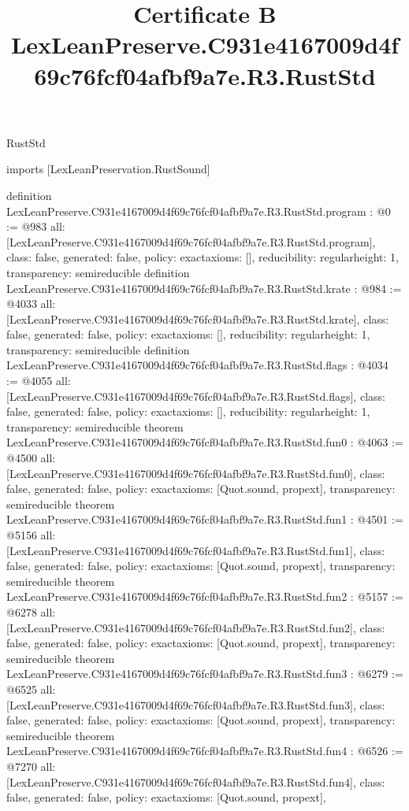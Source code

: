 \begin{lexlean}{RustStd}
\title{Certificate B LexLeanPreserve.C931e4167009d4f69c76fcf04afbf9a7e.R3.RustStd}
\begin{coremodule}
imports [LexLeanPreservation.RustSound]

definition LexLeanPreserve.C931e4167009d4f69c76fcf04afbf9a7e.R3.RustStd.program : @0 := @983 {
  all: [LexLeanPreserve.C931e4167009d4f69c76fcf04afbf9a7e.R3.RustStd.program],
  class: false,
  generated: false,
  policy: exact{axioms: []},
  reducibility: regular{height: 1},
  transparency: semireducible
}
definition LexLeanPreserve.C931e4167009d4f69c76fcf04afbf9a7e.R3.RustStd.krate : @984 := @4033 {
  all: [LexLeanPreserve.C931e4167009d4f69c76fcf04afbf9a7e.R3.RustStd.krate],
  class: false,
  generated: false,
  policy: exact{axioms: []},
  reducibility: regular{height: 1},
  transparency: semireducible
}
definition LexLeanPreserve.C931e4167009d4f69c76fcf04afbf9a7e.R3.RustStd.flags : @4034 := @4055 {
  all: [LexLeanPreserve.C931e4167009d4f69c76fcf04afbf9a7e.R3.RustStd.flags],
  class: false,
  generated: false,
  policy: exact{axioms: []},
  reducibility: regular{height: 1},
  transparency: semireducible
}
theorem LexLeanPreserve.C931e4167009d4f69c76fcf04afbf9a7e.R3.RustStd.fun0 : @4063 := @4500 {
  all: [LexLeanPreserve.C931e4167009d4f69c76fcf04afbf9a7e.R3.RustStd.fun0],
  class: false,
  generated: false,
  policy: exact{axioms: [Quot.sound, propext]},
  transparency: semireducible
}
theorem LexLeanPreserve.C931e4167009d4f69c76fcf04afbf9a7e.R3.RustStd.fun1 : @4501 := @5156 {
  all: [LexLeanPreserve.C931e4167009d4f69c76fcf04afbf9a7e.R3.RustStd.fun1],
  class: false,
  generated: false,
  policy: exact{axioms: [Quot.sound, propext]},
  transparency: semireducible
}
theorem LexLeanPreserve.C931e4167009d4f69c76fcf04afbf9a7e.R3.RustStd.fun2 : @5157 := @6278 {
  all: [LexLeanPreserve.C931e4167009d4f69c76fcf04afbf9a7e.R3.RustStd.fun2],
  class: false,
  generated: false,
  policy: exact{axioms: [Quot.sound, propext]},
  transparency: semireducible
}
theorem LexLeanPreserve.C931e4167009d4f69c76fcf04afbf9a7e.R3.RustStd.fun3 : @6279 := @6525 {
  all: [LexLeanPreserve.C931e4167009d4f69c76fcf04afbf9a7e.R3.RustStd.fun3],
  class: false,
  generated: false,
  policy: exact{axioms: [Quot.sound, propext]},
  transparency: semireducible
}
theorem LexLeanPreserve.C931e4167009d4f69c76fcf04afbf9a7e.R3.RustStd.fun4 : @6526 := @7270 {
  all: [LexLeanPreserve.C931e4167009d4f69c76fcf04afbf9a7e.R3.RustStd.fun4],
  class: false,
  generated: false,
  policy: exact{axioms: [Quot.sound, propext]},
}
\end{coremodule}
\end{lexlean}
